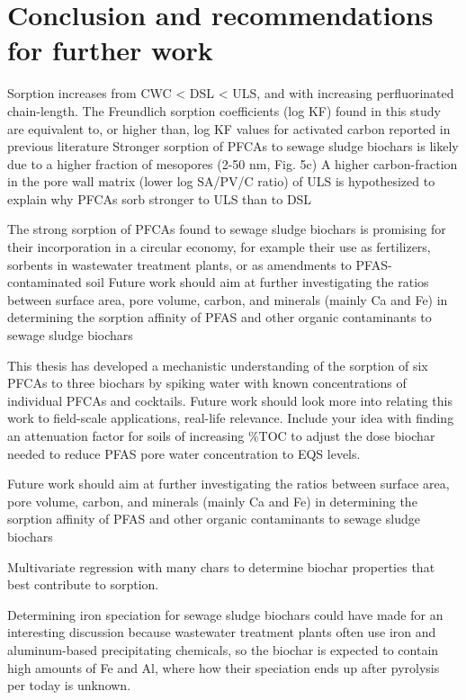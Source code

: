 \chapter{Conclusion and recommendations for further work}\label{chap:Conclusion}

Sorption increases from CWC < DSL < ULS, and with increasing perfluorinated chain-length. The Freundlich sorption coefficients (log KF) found in this study are equivalent to, or higher than, log KF  values for activated carbon reported in previous literature
Stronger sorption of PFCAs to sewage sludge biochars is likely due to a higher fraction of mesopores (2-50 nm, Fig. 5c)
A higher carbon-fraction in the pore wall matrix (lower log SA/PV/C ratio) of ULS is hypothesized to explain why PFCAs sorb stronger to ULS than to DSL 

The strong sorption of PFCAs found to sewage sludge biochars is promising for their incorporation in a circular economy, for example their use as fertilizers, sorbents in wastewater treatment plants, or as amendments to PFAS-contaminated soil
Future work should aim at further investigating the ratios between surface area, pore volume, carbon, and minerals (mainly Ca and Fe) in determining the sorption affinity of PFAS and other organic contaminants to sewage sludge biochars

This thesis has developed a mechanistic understanding of the sorption of six PFCAs to three biochars by spiking water with known concentrations of individual PFCAs and cocktails. Future work should look more into relating this work to field-scale applications, real-life relevance. Include your idea with finding an attenuation factor for soils of increasing \%TOC to adjust the dose biochar needed to reduce PFAS pore water concentration to EQS levels. 

Future work should aim at further investigating the ratios between surface area, pore volume, carbon, and minerals (mainly Ca and Fe) in determining the sorption affinity of PFAS and other organic contaminants to sewage sludge biochars

Multivariate regression with many chars to determine biochar properties that best contribute to sorption.

Determining iron speciation for sewage sludge biochars could have made for an interesting discussion because wastewater treatment plants often use iron and aluminum-based precipitating chemicals, so the biochar is expected to contain high amounts of Fe and Al, where how their speciation ends up after pyrolysis per today is unknown. 






